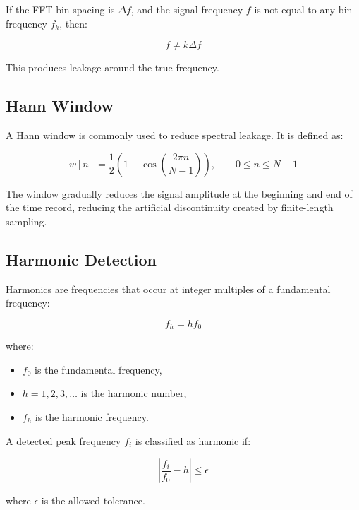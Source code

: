 \documentclass[11pt,a4paper]{article}
\begin{document}
If the FFT bin spacing is \(\Delta f\), and the signal frequency \(f\) is not equal to any bin frequency \(f_k\), then:

\begin{equation}
    f \neq k \Delta f
\end{equation}

This produces leakage around the true frequency.

\subsection{Hann Window}

A Hann window is commonly used to reduce spectral leakage. It is defined as:

\begin{equation}
    w[n] =
    \frac{1}{2}
    \left(
    1 - \cos
    \left(
    \frac{2\pi n}{N-1}
    \right)
    \right),
    \qquad 0 \leq n \leq N-1
\end{equation}

The window gradually reduces the signal amplitude at the beginning and end of the time record, reducing the artificial discontinuity created by finite-length sampling.

\subsection{Harmonic Detection}

Harmonics are frequencies that occur at integer multiples of a fundamental frequency:

\begin{equation}
    f_h = h f_0
\end{equation}

where:

\begin{itemize}
    \item \(f_0\) is the fundamental frequency,
    \item \(h = 1,2,3,\dots\) is the harmonic number,
    \item \(f_h\) is the harmonic frequency.
\end{itemize}

A detected peak frequency \(f_i\) is classified as harmonic if:

\begin{equation}
    \left|
    \frac{f_i}{f_0} - h
    \right|
    \leq \epsilon
\end{equation}

where \(\epsilon\) is the allowed tolerance.
\end{document}
